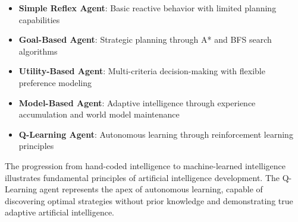 \documentclass[11pt,a4paper]{article}
\begin{document}
\begin{itemize}
\item \textbf{Simple Reflex Agent}: Basic reactive behavior with limited planning capabilities
\item \textbf{Goal-Based Agent}: Strategic planning through A* and BFS search algorithms
\item \textbf{Utility-Based Agent}: Multi-criteria decision-making with flexible preference modeling
\item \textbf{Model-Based Agent}: Adaptive intelligence through experience accumulation and world model maintenance
\item \textbf{Q-Learning Agent}: Autonomous learning through reinforcement learning principles
\end{itemize}

The progression from hand-coded intelligence to machine-learned intelligence illustrates fundamental principles of artificial intelligence development. The Q-Learning agent represents the apex of autonomous learning, capable of discovering optimal strategies without prior knowledge and demonstrating true adaptive artificial intelligence.
\end{document}
